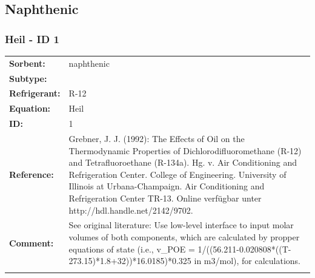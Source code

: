 \subsection{Naphthenic }
%
\subsubsection{Heil - ID 1}
%
\begin{tabular}[l]{|lp{11.5cm}|}
\hline
\addlinespace

\textbf{Sorbent:} & naphthenic \\
\textbf{Subtype:} &  \\
\textbf{Refrigerant:} & R-12 \\
\textbf{Equation:} & Heil \\
\textbf{ID:} & 1 \\
\textbf{Reference:} & Grebner, J. J. (1992): The Effects of Oil on the Thermodynamic Properties of Dichlorodifluoromethane (R-12) and Tetrafluoroethane (R-134a). Hg. v. Air Conditioning and Refrigeration Center. College of Engineering. University of Illinois at Urbana-Champaign. Air Conditioning and Refrigeration Center TR-13. Online verfügbar unter http://hdl.handle.net/2142/9702. \\
\textbf{Comment:} & See original literature: Use low-level interface to input molar volumes of both components, which are calculated by propper equations of state (i.e., v\_POE =  1/((56.211-0.020808*((T-273.15)*1.8+32))*16.0185)*0.325 in m3/mol), for calculations. \\

\addlinespace
\hline
\end{tabular}
\newline

